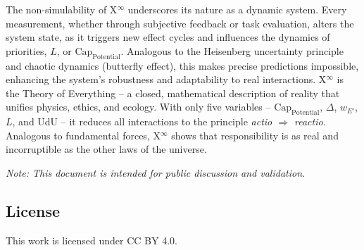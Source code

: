 \documentclass[12pt]{scrartcl}
\begin{document}
The non-simulability of X$^\infty$ underscores its nature as a dynamic system. Every measurement, whether through subjective feedback or task evaluation, alters the system state, as it triggers new effect cycles and influences the dynamics of priorities, $L$, or $\text{Cap}_{\text{Potential}}$. Analogous to the Heisenberg uncertainty principle and chaotic dynamics (butterfly effect), this makes precise predictions impossible, enhancing the system’s robustness and adaptability to real interactions. X$^\infty$ is the Theory of Everything – a closed, mathematical description of reality that unifies physics, ethics, and ecology. With only five variables – $\text{Cap}_{\text{Potential}}$, $\Delta$, $w_{E'}$, $L$, and UdU – it reduces all interactions to the principle \emph{actio $\Rightarrow$ reactio}. Analogous to fundamental forces, X$^\infty$ shows that responsibility is as real and incorruptible as the other laws of the universe.

\textit{Note: This document is intended for public discussion and validation.}

\subsection{License}
This work is licensed under CC BY 4.0.
\end{document}
